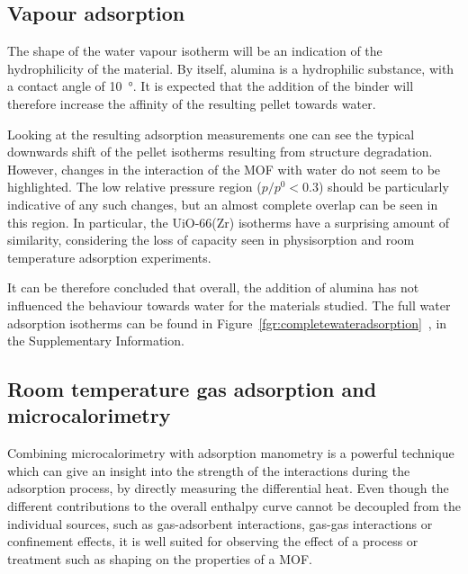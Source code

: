 \subsection{Vapour adsorption}

The shape of the water vapour isotherm will be an indication of the hydrophilicity
of the material. By itself, alumina is a hydrophilic substance, with a contact 
angle of \SI{10}{\degree}. It is expected that the addition of the binder will
therefore increase the affinity of the resulting pellet towards water.

Looking at the resulting adsorption measurements one can see the typical downwards
shift of the pellet isotherms resulting from structure degradation. However, changes
in the interaction of the MOF with water do not seem to be highlighted. The low relative
pressure region (\(p/p^0 < 0.3\)) should be particularly indicative of any such 
changes, but an almost complete overlap can be seen in this region.
In particular, the UiO-66(Zr) isotherms have a surprising amount of similarity,
considering the loss of capacity seen in  physisorption and room temperature 
adsorption experiments.

It can be therefore concluded that overall, the addition of alumina has not influenced 
the behaviour towards water for the materials studied. The full water adsorption isotherms
can be found in Figure~\ref*{fgr:completewateradsorption}~, in the Supplementary Information.

\subsection{Room temperature gas adsorption and microcalorimetry}

Combining microcalorimetry with adsorption manometry is a powerful technique which can
give an insight into the strength of the interactions during the adsorption process,
by directly measuring the differential heat. Even though the different contributions 
to the overall enthalpy curve cannot be decoupled from the individual sources, 
such as gas-adsorbent interactions, gas-gas interactions or confinement effects, it 
is well suited for observing the effect of a process or treatment such as shaping
on the properties of a MOF.

